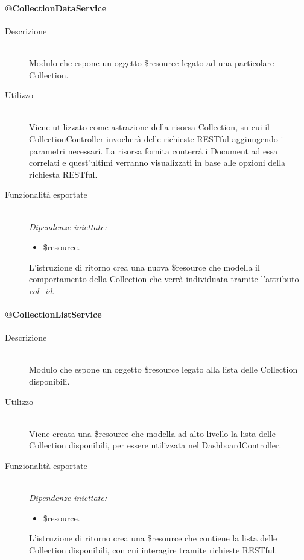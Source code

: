 \paragraph{@CollectionDataService}
\begin{description}
 \item[Descrizione] \hfill \\
 Modulo che espone un oggetto \$resource legato ad una particolare Collection. 
 
 \item[Utilizzo] \hfill \\
 Viene utilizzato come astrazione della risorsa Collection, su cui il CollectionController invocherà delle richieste RESTful aggiungendo 
 i parametri necessari. La risorsa fornita conterr\'{a} i Document ad essa correlati e quest'ultimi verranno visualizzati in base alle 
 opzioni della richiesta RESTful.
 
 \item[Funzionalità esportate] \hfill \\
 \emph{Dipendenze iniettate:}
 \begin{itemize}
  \item \$resource.
 \end{itemize}
 L'istruzione di ritorno crea una nuova \$resource che modella il comportamento della Collection che verrà individuata tramite l'attributo 
 \emph{col\_id}.
\end{description}

\paragraph{@CollectionListService}
\begin{description}
 \item[Descrizione] \hfill \\
 Modulo che espone un oggetto \$resource legato alla lista delle Collection disponibili.
 
 \item[Utilizzo] \hfill \\
 Viene creata una \$resource che modella ad alto livello la lista delle Collection disponibili, per essere utilizzata nel DashboardController.
 
 \item[Funzionalità esportate] \hfill \\
 \emph{Dipendenze iniettate:}
 \begin{itemize}
  \item \$resource.
 \end{itemize}
 L'istruzione di ritorno crea una \$resource che contiene la lista delle Collection disponibili, con 
 cui interagire tramite richieste RESTful.
 
\end{description}

